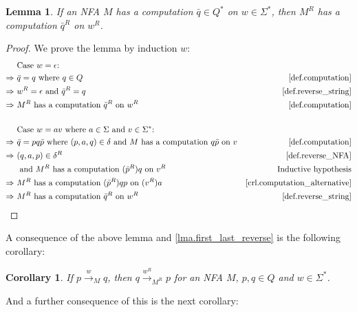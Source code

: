 \documentclass{report}
\newtheorem{lemma}[theorem]{Lemma}
\newtheorem{corollary}[theorem]{Corollary}
\theoremstyle{definition}
\begin{document}
\begin{appendices}
\begin{lemma} \label{lma.reverse_computation}
If an NFA $M$ has a computation $\bar{q} \in Q^{\ast}$ on $w \in \Sigma^{\ast}$,
then $M^R$ has a computation $\bar{q}^R$ on $w^R$.
\end{lemma}

\begin{proof}
We prove the lemma by induction $w$:
\begin{align*}
& \text{Case } w = \epsilon \text{:} \\
\Rightarrow \ & \bar{q} = q \text{ where } q \in Q
& \text{\cref{def.computation}} \\
\Rightarrow \ & w^R = \epsilon \text{ and } \bar{q}^R = q
& \text{\cref{def.reverse_string}} \\
\Rightarrow \ & M^R \text{ has a computation } \bar{q}^R \text{ on } w^R
& \text{\cref{def.computation}} \\
\\
& \text{Case } w = av \text{ where } a \in \Sigma \text{ and } v \in \Sigma^{\ast}
\text{:} \\
\Rightarrow \ & \bar{q} = pq \bar{p} \text{ where } (p, a, q) \in \delta
\text{ and } M \text{ has a computation } q \bar{p} \text{ on } v
& \text{\cref{def.computation}} \\
\Rightarrow \ & (q, a, p) \in \delta^R
& \text{\cref{def.reverse_NFA}} \\
& \text{ and } M^R \text{ has a computation } (\bar{p}^R) q \text{ on } v^R
& \text{Inductive hypothesis} \\
\Rightarrow \ & M^R \text{ has a computation } (\bar{p}^R) qp \text{ on } (v^R) a
& \text{\cref{crl.computation_alternative}} \\
\Rightarrow \ & M^R \text{ has a computation } \bar{q}^R \text{ on } w^R
& \text{\cref{def.reverse_string}} \\
\end{align*}
\end{proof}

A consequence of the above lemma and \cref{lma.first_last_reverse} is the
following corollary:

\begin{corollary} \label{crl.reverse_arrow_computation}
If $p \xrightarrow{w}_M q$, then $q \xrightarrow{w^R}_{M^R} p$ for an NFA $M$,
$p, q \in Q$ and $w \in \Sigma^{\ast}$.
\end{corollary}

And a further consequence of this is the next corollary:


\end{appendices}
\end{document}
